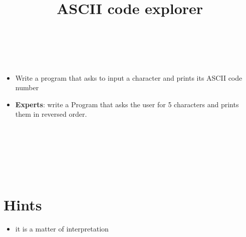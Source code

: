


\title{ASCII code explorer} %
\author{} %
\renewcommand{\difficulty}{Easy} %
\renewcommand{\requirements}{Variables, input/output} %
\renewcommand{\aims}{Get to know ASCII} %


 \maketitle
 \taskinfos

\ \\\ \\
\begin{itemize}
	\item Write a program that asks to input a character and prints its ASCII code number
	\item \textbf{Experts}: write a Program that asks the user for 5 characters and prints them in reversed order.
\end{itemize}	
 
 
\ \\\ \\\ \\\ \\\ \\
\section*{Hints}
	\begin{itemize}
		\item it is a matter of interpretation
	\end{itemize}
 

